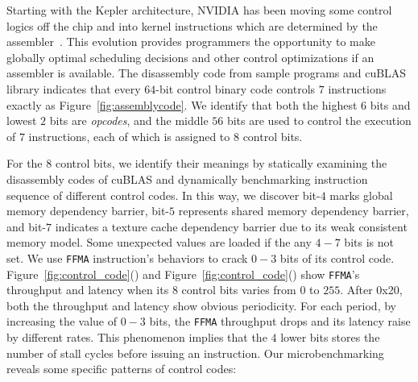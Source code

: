 Starting with the Kepler architecture, NVIDIA has been moving some control logics off the chip and into kernel
instructions which are determined by the assembler~\cite{lai,maxas}. This evolution provides programmers the opportunity to
make globally optimal scheduling decisions and other control optimizations if an assembler is available. The disassembly code from sample programs and cuBLAS library indicates that every $64$-bit control binary code controls $7$ instructions exactly as Figure~\ref{fig:assemblycode}.
We identify that both the highest $6$ bits and lowest
$2$ bits are {\em opcodes}, and the middle $56$ bits are used to control the execution of $7$
instructions, each of which is assigned to $8$ control bits.

For the $8$ control bits, we identify their meanings by statically examining the disassembly codes of cuBLAS and
dynamically benchmarking instruction sequence of different control codes.
In this way, we discover bit-$4$ marks global memory dependency barrier, bit-$5$ represents shared memory dependency barrier, and bit-$7$ indicates a texture cache dependency barrier due to its weak consistent memory model.
Some unexpected values are loaded if the any $4-7$ bits is not set.
We use {\tt FFMA} instruction's behaviors to crack $0-3$ bits of its control code.
Figure~\ref{fig:control_code}() and
Figure~\ref{fig:control_code}() show {\tt FFMA}'s throughput and latency  when its $8$ control bits varies from $0$ to $255$.
After 0x20, both the throughput and latency show obvious periodicity.
For each period, by increasing the value of $0-3$ bits, the {\tt FFMA} throughput drops and its latency raise by different rates. 
This phenomenon implies that the $4$ lower bits stores the number of stall cycles before issuing
an instruction.
Our microbenchmarking reveals some specific patterns of control codes:

